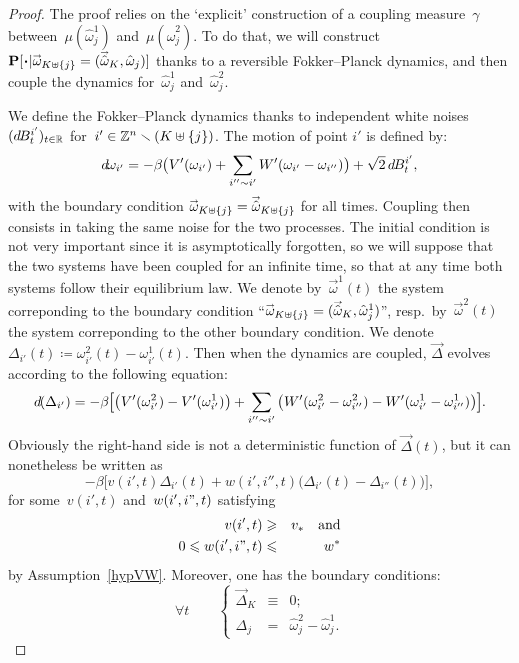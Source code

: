 \begin{proof}
The proof relies on the `explicit' construction of a coupling measure~$\gamma$
between~$\mu(\hat\omega_j^1)$ and~$\mu(\hat\omega_j^2)$.
To do that, we will construct $\Pr[\Bcdot|\vec{\omega}_{K\uplus\{j\}}=(\vechat{\omega}_K,\hat\omega_j)]$
thanks to a reversible Fokker--Planck dynamics, and then couple the dynamics
for~$\hat\omega_j^1$ and~$\hat\omega_j^2$.

We define the Fokker--Planck dynamics thanks to independent white noises
$(\dx B^{i'}_t)_{t\in\RR}$ for~$i' \in {\mathbb{Z}^n \smallsetminus(K\uplus\{j\})}$.
The motion of point $i'$ is defined by:
\[ \dx\omega_{i'} = -\beta \big( V'(\omega_{i'}) +
\sum_{i''\sim i'} W'(\omega_{i'}-\omega_{i''}) \big) + \sqrt{2} \,\dx{B^{i'}_t} ,\]
with the boundary condition $\vec\omega_{K\uplus\{j\}} = \vechat{\omega}_{K\uplus\{j\}}$
for all times.
%
Coupling then consists in taking the same noise for the two processes.
The initial condition is not very important since it is asymptotically forgotten,
so we will suppose that the two systems have been coupled for an infinite time,
so that at any time both systems follow their equilibrium law.
We denote by~$\vec\omega^1(t)$ the system correponding to the boundary condition
``$\vec\omega_{K\uplus\{j\}} = (\vechat{\omega}_K,\hat\omega_j^1)$'',
resp.\ by~$\vec\omega^2(t)$ the system correponding to the other boundary condition.
We denote $\Delta_{i'}(t) \coloneqq \omega_{i'}^2(t) - \omega_{i'}^1(t)$.
Then when the dynamics are coupled,
$\vec{\Delta}$ evolves according to the following equation:
%
\[ \dx(\Delta_{i'}) =
-\beta \Big[ \big( V'(\omega^2_{i'}) - V'(\omega^1_{i'}) \big) +
\sum_{i''\sim i'} \big( W'(\omega^2_{i'}-\omega^2_{i''}) - W'(\omega^1_{i'}-\omega^1_{i''}) \big) \Big] .\]
%
Obviously the right-hand side is not a deterministic function of
$\vec{\Delta}(t)$, but it can nonetheless be written as
\[ -\beta \big[ v(i',t) \Delta_{i'}(t)
+ w(i',i'',t) \big( \Delta_{i'}(t) - \Delta_{i''}(t) \big) \big] ,\]
for some~$v(i',t)$ and~$w(i',i",t)$ satisfying
%
\begin{eqnarray}
\label{for0346v} v(i',t) & \geq & v_* \quad \text{and} \\
\label{for0346w} 0 \leq w(i',i",t) & \leq & w^* \end{eqnarray}
by Assumption~\ref{hypVW}.
%
Moreover, one has the boundary conditions:
\[ \forall t \qquad \left\{
\begin{array}{rcl} \vec{\Delta}_K &\equiv& 0 ;\\
\Delta_j &=& \hat\omega_j^2 - \hat\omega_j^1 . \end{array} \right.\]


\end{proof}
